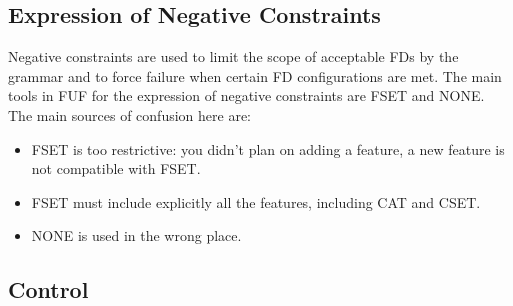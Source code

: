 \documentclass[10pt,a4paper]{report}
\begin{document}
\subsection{Expression of Negative Constraints}

Negative constraints are used to limit the scope of acceptable FDs by the
grammar and to force failure when certain FD configurations are met.  The
main tools in FUF for the expression of negative constraints are FSET and
NONE.  The main sources of confusion here are:
\begin{itemize}
\item FSET is too restrictive: you didn't plan on adding a feature, a new feature
is not compatible with FSET.  

\item FSET must include explicitly all the features, including CAT and CSET.

\item NONE is used in the wrong place.
\end{itemize}


\subsection{Control}
\end{document}

